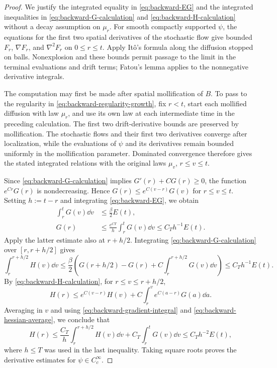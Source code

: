 \documentclass[11pt,reqno]{amsart}
\numberwithin{equation}{section}
\theoremstyle{plain}
\theoremstyle{remark}
\begin{document}
\begin{proof}
We justify the integrated equality in \eqref{eq:backward-EG} and the integrated inequalities in \eqref{eq:backward-G-calculation} and \eqref{eq:backward-H-calculation} without a decay assumption on $\mu_r$. For smooth compactly supported $\psi$, the equations for the first two spatial derivatives of the stochastic flow give bounded $F_r$, $\nabla F_r$, and $\nabla^2F_r$ on $0\le r\le t$. Apply It\^o's formula along the diffusion stopped on balls. Nonexplosion and these bounds permit passage to the limit in the terminal evaluations and drift terms; Fatou's lemma applies to the nonnegative derivative integrals.

The computation may first be made after spatial mollification of $B$. To pass to the regularity in \eqref{eq:backward-regularity-growth}, fix $r<t$, start each mollified diffusion with law $\mu_r$, and use its own law at each intermediate time in the preceding calculation. The first two drift-derivative bounds are preserved by mollification. The stochastic flows and their first two derivatives converge after localization, while the evaluations of $\psi$ and its derivatives remain bounded uniformly in the mollification parameter. Dominated convergence therefore gives the stated integrated relations with the original laws $\mu_v$, $r\le v\le t$.

Since \eqref{eq:backward-G-calculation} implies $G'(r)+CG(r)\ge0$, the function $e^{Cr}G(r)$ is nondecreasing. Hence $G(r)\le e^{C(v-r)}G(v)$ for $r\le v\le t$. Setting $h:=t-r$ and integrating \eqref{eq:backward-EG}, we obtain
\begin{align}
 \int_r^tG(v)\dd v&\le\frac\beta2E(t),
 \label{eq:backward-gradient-integral}\\
 G(r)&\le\frac{e^{CT}}h\int_r^tG(v)\dd v\le C_Th^{-1}E(t).
 \label{eq:backward-gradient-average}
\end{align}
Apply the latter estimate also at $r+h/2$. Integrating \eqref{eq:backward-G-calculation} over $[r,r+h/2]$ gives
\begin{equation}
 \int_r^{r+h/2}H(v)\dd v \le\frac\beta2\left(G(r+h/2)-G(r) +C\int_r^{r+h/2}G(v)\dd v\right) \le C_Th^{-1}E(t). \label{eq:backward-hessian-average}
\end{equation}
By \eqref{eq:backward-H-calculation}, for $r\le v\le r+h/2$,
\begin{equation}\label{eq:backward-hessian-propagation}
 H(r)\le e^{C(v-r)}H(v)+C\int_r^v e^{C(a-r)}G(a)\dd a.
\end{equation}
Averaging in $v$ and using \eqref{eq:backward-gradient-integral} and \eqref{eq:backward-hessian-average}, we conclude that
\begin{equation}\label{eq:backward-hessian-final}
 H(r)\le\frac{C_T}h\int_r^{r+h/2}H(v)\dd v
                +C_T\int_r^tG(v)\dd v
       \le C_Th^{-2}E(t),
\end{equation}
where $h\le T$ was used in the last inequality. Taking square roots proves the derivative estimates for $\psi\in C_c^\infty$.


\end{proof}
\end{document}

